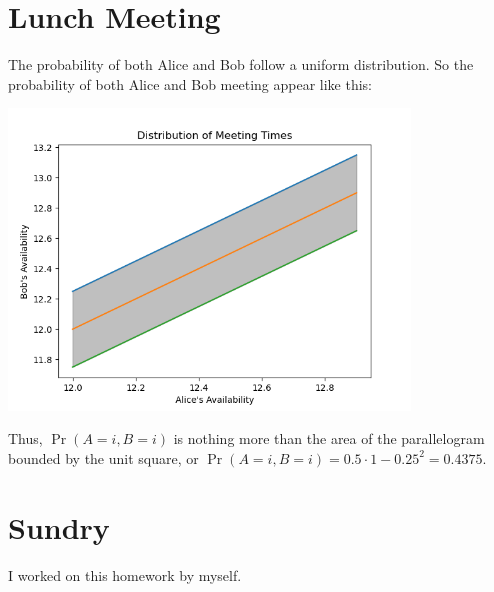 \documentclass{article}
\begin{document}
\newpage
\section{Lunch Meeting}

The probability of both Alice and Bob follow a uniform distribution.
So the probability of both Alice and Bob meeting appear like this:
\begin{center}
    \includegraphics[width=0.8\textwidth]{q4.png}
\end{center}
Thus, \(\Pr(A = i, B = i)\) is nothing more than the area of the parallelogram bounded by the unit square, or \(\Pr(A = i, B = i) = 0.5 \cdot 1 - 0.25^2 = \num{0.4375}\).

\section{Sundry}

I worked on this homework by myself.
\end{document}
